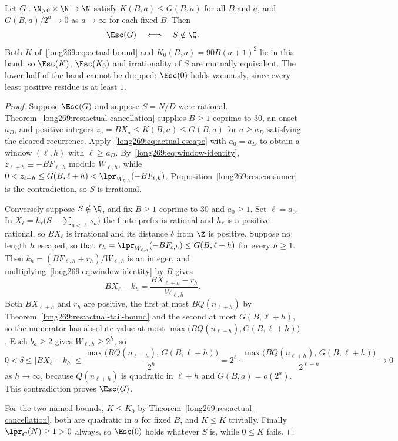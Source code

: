 \begin{theorem}\label{long269:res:actual-escape-endpoint}
\label{long269:res:lead-escape-equivalence}\label{long269:res:windowconsumer}
Let $G:\N_{>0}\times\N\to\N$ satisfy $K(B,a)\le G(B,a)$ for all $B$ and $a$,
and $G(B,a)/2^{a}\to0$ as $a\to\infty$ for each fixed $B$.  Then
\[
 \Esc(G)\quad\Longleftrightarrow\quad S\notin\Q .
\]
Both $K$ of~\eqref{long269:eq:actual-bound} and $K_0(B,a)=90B(a+1)^{2}$ lie in this
band, so $\Esc(K)$, $\Esc(K_0)$ and irrationality of $S$ are mutually
equivalent.  The lower half of the band cannot be dropped: $\Esc(0)$ holds
vacuously, since every least positive residue is at least $1$.
\end{theorem}

\begin{proof}
Suppose $\Esc(G)$ and suppose $S=N/D$ were rational.
Theorem~\ref{long269:res:actual-cancellation} supplies $B\ge1$ coprime to $30$, an
onset $a_D$, and positive integers $z_a=BX_a\le K(B,a)\le G(B,a)$ for
$a\ge a_D$ satisfying the cleared recurrence.  Apply~\eqref{long269:eq:actual-escape}
with $a_0=a_D$ to obtain a window $(\ell,h)$ with $\ell\ge a_D$.
By~\eqref{long269:eq:window-identity}, $z_{\ell+h}\equiv-BF_{\ell,h}$ modulo
$W_{\ell,h}$, while $0<z_{\ell+h}\le G(B,\ell+h)<\lpr_{W_{\ell,h}}(-BF_{\ell,h})$.
Proposition~\ref{long269:res:consumer} is the contradiction, so $S$ is irrational.

Conversely suppose $S\notin\Q$, and fix $B\ge1$ coprime to $30$ and $a_0\ge1$.
Set $\ell=a_0$.  In $X_\ell=h_\ell\bigl(S-\sum_{a<\ell}s_a\bigr)$ the finite
prefix is rational and $h_\ell$ is a positive rational, so $BX_\ell$ is
irrational and its distance $\delta$ from $\Z$ is positive.  Suppose no length
$h$ escaped, so that $r_h=\lpr_{W_{\ell,h}}(-BF_{\ell,h})\le G(B,\ell+h)$ for
every $h\ge1$.  Then $k_h=(BF_{\ell,h}+r_h)/W_{\ell,h}$ is an integer, and
multiplying~\eqref{long269:eq:window-identity} by $B$ gives
\[
 BX_\ell-k_h=\frac{BX_{\ell+h}-r_h}{W_{\ell,h}} .
\]
Both $BX_{\ell+h}$ and $r_h$ are positive, the first at most
$BQ(n_{\ell+h})$ by Theorem~\ref{long269:res:actual-tail-bound} and the second at most
$G(B,\ell+h)$, so the numerator has absolute value at most
$\max\bigl(BQ(n_{\ell+h}),G(B,\ell+h)\bigr)$.  Each $b_a\ge2$ gives
$W_{\ell,h}\ge2^{h}$, so
\[
 0<\delta\le|BX_\ell-k_h|
 \le\frac{\max\bigl(BQ(n_{\ell+h}),\,G(B,\ell+h)\bigr)}{2^{h}}
 =2^{\ell}\cdot
 \frac{\max\bigl(BQ(n_{\ell+h}),\,G(B,\ell+h)\bigr)}{2^{\ell+h}}
 \longrightarrow0
\]
as $h\to\infty$, because $Q(n_{\ell+h})$ is quadratic in $\ell+h$ and
$G(B,a)=o(2^{a})$.  This contradiction proves $\Esc(G)$.

For the two named bounds, $K\le K_0$ by
Theorem~\ref{long269:res:actual-cancellation}, both are quadratic in $a$ for fixed $B$,
and $K\le K$ trivially.  Finally $\lpr_C(N)\ge1>0$ always, so $\Esc(0)$ holds
whatever $S$ is, while $0\le K$ fails.
\end{proof}

